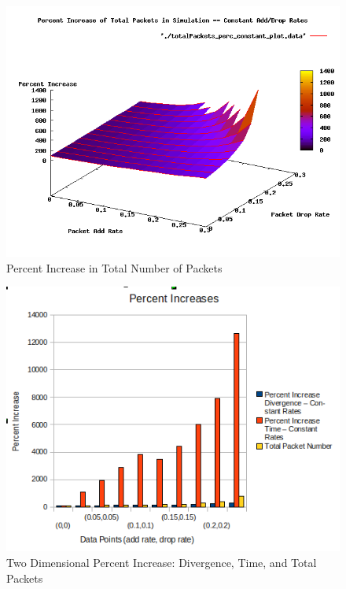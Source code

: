 \documentclass{usenixsubmit}
\begin{document}
\begin{figure}
	\centering
		\includegraphics[scale=0.5]{./plots/totalPackets_perc_constant_plot.png}
	\caption{Percent Increase in Total Number of Packets}
	\label{fig:countpercplot}
\end{figure}
\begin{figure}
	\centering
		\includegraphics[scale=0.65]{./plots/PercentIncreases_constant.png}
	\caption{Two Dimensional Percent Increase: Divergence, Time, and Total 
		Packets}
	\label{fig:bar1}
\end{figure}
\end{document}
